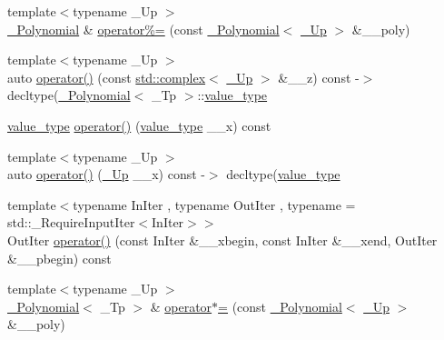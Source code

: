 \begin{DoxyCompactItemize}
\item 
{\footnotesize template$<$typename \+\_\+\+Up $>$ }\\\hyperlink{class____gnu__cxx_1_1__Polynomial}{\+\_\+\+Polynomial} \& \hyperlink{class____gnu__cxx_1_1__Polynomial_a66661e25c272a310f7bf1abbcc8fa2a9}{operator\%=} (const \hyperlink{class____gnu__cxx_1_1__Polynomial}{\+\_\+\+Polynomial}$<$ \hyperlink{class____gnu__cxx_1_1__Polynomial_a242114d4b86648a5dff67a8221f80d40}{\+\_\+\+Up} $>$ \&\+\_\+\+\_\+poly)
\item 
{\footnotesize template$<$typename \+\_\+\+Up $>$ }\\auto \hyperlink{class____gnu__cxx_1_1__Polynomial_a14a9a08043909e50269eef0d66995794}{operator()} (const \hyperlink{classstd_1_1complex}{std\+::complex}$<$ \hyperlink{class____gnu__cxx_1_1__Polynomial_a242114d4b86648a5dff67a8221f80d40}{\+\_\+\+Up} $>$ \&\+\_\+\+\_\+z) const -\/$>$ decltype(\hyperlink{class____gnu__cxx_1_1__Polynomial}{\+\_\+\+Polynomial}$<$ \+\_\+\+Tp $>$\+::\hyperlink{class____gnu__cxx_1_1__Polynomial_a725563351f50e76084a7a016c06f8a53}{value\+\_\+type}
\item 
\hyperlink{class____gnu__cxx_1_1__Polynomial_a725563351f50e76084a7a016c06f8a53}{value\+\_\+type} \hyperlink{class____gnu__cxx_1_1__Polynomial_a9aa91f3424896c07d51fa09950825549}{operator()} (\hyperlink{class____gnu__cxx_1_1__Polynomial_a725563351f50e76084a7a016c06f8a53}{value\+\_\+type} \+\_\+\+\_\+x) const
\item 
{\footnotesize template$<$typename \+\_\+\+Up $>$ }\\auto \hyperlink{class____gnu__cxx_1_1__Polynomial_a064c220c67f2d72104b3d4767ca5cc42}{operator()} (\hyperlink{class____gnu__cxx_1_1__Polynomial_a242114d4b86648a5dff67a8221f80d40}{\+\_\+\+Up} \+\_\+\+\_\+x) const -\/$>$ decltype(\hyperlink{class____gnu__cxx_1_1__Polynomial_a725563351f50e76084a7a016c06f8a53}{value\+\_\+type}
\item 
{\footnotesize template$<$typename In\+Iter , typename Out\+Iter , typename  = std\+::\+\_\+\+Require\+Input\+Iter$<$\+In\+Iter$>$$>$ }\\Out\+Iter \hyperlink{class____gnu__cxx_1_1__Polynomial_a06d7b0b57d6764da29049b3c2b6f890c}{operator()} (const In\+Iter \&\+\_\+\+\_\+xbegin, const In\+Iter \&\+\_\+\+\_\+xend, Out\+Iter \&\+\_\+\+\_\+pbegin) const
\item 
{\footnotesize template$<$typename \+\_\+\+Up $>$ }\\\hyperlink{class____gnu__cxx_1_1__Polynomial}{\+\_\+\+Polynomial}$<$ \+\_\+\+Tp $>$ \& \hyperlink{class____gnu__cxx_1_1__Polynomial_a5e5dae4944bc0352b6b360f8decd2d07}{operator$\ast$=} (const \hyperlink{class____gnu__cxx_1_1__Polynomial}{\+\_\+\+Polynomial}$<$ \hyperlink{class____gnu__cxx_1_1__Polynomial_a242114d4b86648a5dff67a8221f80d40}{\+\_\+\+Up} $>$ \&\+\_\+\+\_\+poly)

\end{DoxyCompactItemize}
